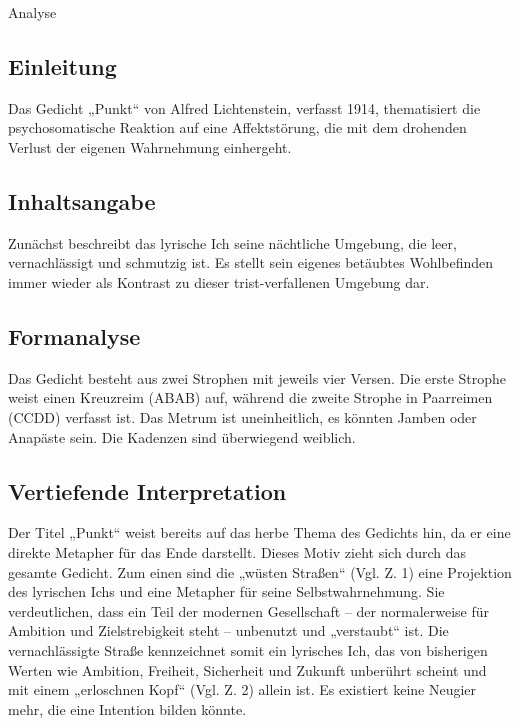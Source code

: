 \documentclass[11pt,a4paper,oneside]{article}
\begin{document}
	\begin{loesung}{Analyse}
		\subsection*{Einleitung}
		Das Gedicht „Punkt“ von Alfred Lichtenstein, verfasst 1914, thematisiert die psychosomatische Reaktion auf eine Affektstörung, die mit dem drohenden Verlust der eigenen Wahrnehmung einhergeht.
		\vspace{5mm}
		
		\subsection*{Inhaltsangabe}
		Zunächst beschreibt das lyrische Ich seine nächtliche Umgebung, die leer, vernachlässigt und schmutzig ist. Es stellt sein eigenes betäubtes Wohlbefinden immer wieder als Kontrast zu dieser trist-verfallenen Umgebung dar.
		\vspace{5mm}
		
		\subsection*{Formanalyse}
		Das Gedicht besteht aus zwei Strophen mit jeweils vier Versen. Die erste Strophe weist einen Kreuzreim (ABAB) auf, während die zweite Strophe in Paarreimen (CCDD) verfasst ist. Das Metrum ist uneinheitlich, es könnten Jamben oder Anapäste sein. Die Kadenzen sind überwiegend weiblich.
		\vspace{5mm}
		
		\subsection*{Vertiefende Interpretation}
		Der Titel „Punkt“ weist bereits auf das herbe Thema des Gedichts hin, da er eine direkte Metapher für das Ende darstellt. Dieses Motiv zieht sich durch das gesamte Gedicht. Zum einen sind die „wüsten Straßen“ (Vgl. Z. 1) eine Projektion des lyrischen Ichs und eine Metapher für seine Selbstwahrnehmung. Sie verdeutlichen, dass ein Teil der modernen Gesellschaft – der normalerweise für Ambition und Zielstrebigkeit steht – unbenutzt und „verstaubt“ ist. Die vernachlässigte Straße kennzeichnet somit ein lyrisches Ich, das von bisherigen Werten wie Ambition, Freiheit, Sicherheit und Zukunft unberührt scheint und mit einem „erloschnen Kopf“ (Vgl. Z. 2) allein ist. Es existiert keine Neugier mehr, die eine Intention bilden könnte.
		

\end{loesung}
\end{document}
